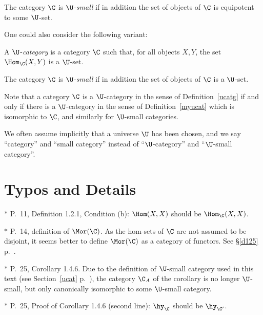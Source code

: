 \documentclass[12pt]{article}
\theoremstyle{remark}
\theoremstyle{definition}
\begin{document}
\begin{df} 
The category $\C$ is $\U$-{\em small} if in addition the set of objects of $\C$ is equipotent to some $\U$-set. 
\end{df} 

One could also consider the following variant: 

\begin{df}[$\U$-category] 
A $\U$-{\em category} is a category $\C$ such that, for all objects $X,Y$, the set $\Hom_\C(X,Y)$ is a $\U$-set. 
\end{df} 

\begin{df}
The category $\C$ is $\U$-{\em small} if in addition the set of objects of $\C$ is a $\U$-set. 
\end{df} 

Note that a category $\C$ is a $\U$-category in the sense of Definition~\ref{ucatg} if and only if there is a $\U$-category in the sense of Definition~\ref{myucat} which is isomorphic to $\C$, and similarly for $\U$-small categories. 
%
\begin{center}
\end{center}

We often assume implicitly that a universe $\U$ has been chosen, and we say ``category'' and ``small category'' instead of ``$\U$-category'' and ``$\U$-small category''.


\section{Typos and Details}

$*$ P.~11, Definition 1.2.1, Condition (b): $\Hom(X,X)$ should be $\Hom_{\C}(X,X)$. 

\nn$*$ P.~14, definition of $\Mor(\C)$. As the hom-sets of $\C$ are not assumed to be disjoint, it seems better to define $\Mor(\C)$ as a category of functors. See \S\ref{d125} p.~. 

\nn$*$ P.~25, Corollary 1.4.6. Due to the definition of $\U$-small category used in this text (see Section~\ref{ucat} p.~), the category $\C_A$ of the corollary is no longer $\U$-small, but only canonically isomorphic to some $\U$-small category. 

\nn$*$ P.~25, Proof of Corollary 1.4.6 (second line): $\hy_{\C}$ should be $\hy_{\C'}$. 
\end{document}
